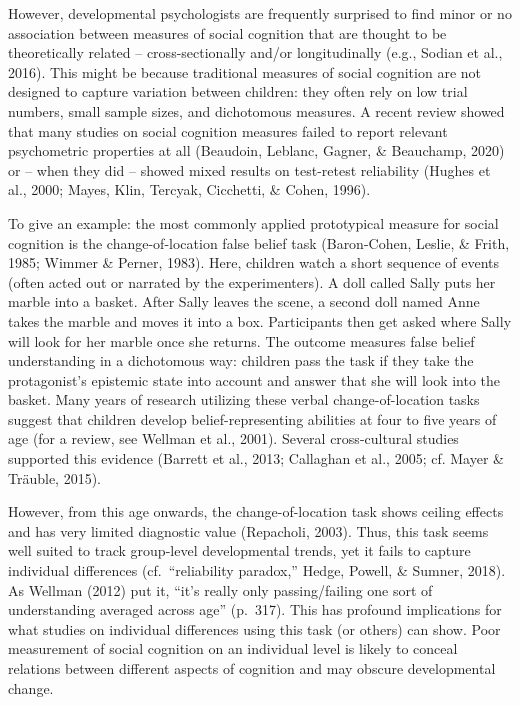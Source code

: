 \documentclass[
  man,floatsintext]{apa6}
\begin{document}
However, developmental psychologists are frequently surprised to find minor or no association between measures of social cognition that are thought to be theoretically related -- cross-sectionally and/or longitudinally (e.g., Sodian et al., 2016). This might be because traditional measures of social cognition are not designed to capture variation between children: they often rely on low trial numbers, small sample sizes, and dichotomous measures. A recent review showed that many studies on social cognition measures failed to report relevant psychometric properties at all (Beaudoin, Leblanc, Gagner, \& Beauchamp, 2020) or -- when they did -- showed mixed results on test-retest reliability (Hughes et al., 2000; Mayes, Klin, Tercyak, Cicchetti, \& Cohen, 1996).

To give an example: the most commonly applied prototypical measure for social cognition is the change-of-location false belief task (Baron-Cohen, Leslie, \& Frith, 1985; Wimmer \& Perner, 1983). Here, children watch a short sequence of events (often acted out or narrated by the experimenters). A doll called Sally puts her marble into a basket. After Sally leaves the scene, a second doll named Anne takes the marble and moves it into a box. Participants then get asked where Sally will look for her marble once she returns. The outcome measures false belief understanding in a dichotomous way: children pass the task if they take the protagonist's epistemic state into account and answer that she will look into the basket. Many years of research utilizing these verbal change-of-location tasks suggest that children develop belief-representing abilities at four to five years of age (for a review, see Wellman et al., 2001). Several cross-cultural studies supported this evidence (Barrett et al., 2013; Callaghan et al., 2005; cf. Mayer \& Träuble, 2015).

However, from this age onwards, the change-of-location task shows ceiling effects and has very limited diagnostic value (Repacholi, 2003). Thus, this task seems well suited to track group-level developmental trends, yet it fails to capture individual differences (cf.~``reliability paradox,'' Hedge, Powell, \& Sumner, 2018).
As Wellman (2012) put it, ``it's really only passing/failing one sort of understanding averaged across age'' (p.~317).
This has profound implications for what studies on individual differences using this task (or others) can show.
Poor measurement of social cognition on an individual level is likely to conceal relations between different aspects of cognition and may obscure developmental change.
\end{document}
